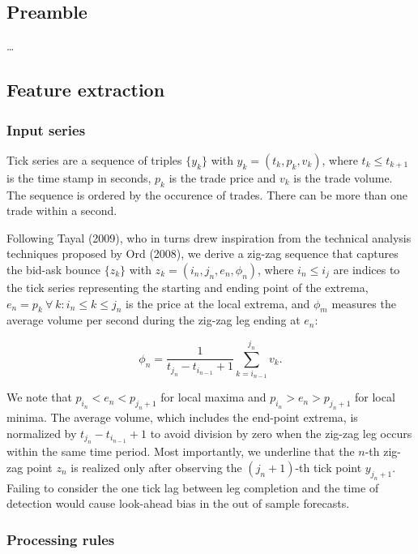 \documentclass[]{article}
\begin{document}
\subsection{Preamble}\label{preamble}

\ldots{}

\subsection{Feature extraction}\label{feature-extraction}

\subsubsection{Input series}\label{input-series}

Tick series are a sequence of triples \(\{y_k\}\) with
\(y_k = (t_k, p_k, v_k)\), where \(t_k \le t_{k+1}\) is the time stamp
in seconds, \(p_k\) is the trade price and \(v_k\) is the trade volume.
The sequence is ordered by the occurence of trades. There can be more
than one trade within a second.

Following Tayal (2009), who in turns drew inspiration from the technical
analysis techniques proposed by Ord (2008), we derive a zig-zag sequence
that captures the bid-ask bounce \(\{z_k\}\) with
\(z_k = (i_n, j_n, e_n, \phi_n)\), where \(i_n \le i_j\) are indices to
the tick series representing the starting and ending point of the
extrema, \(e_n = p_k \ \forall \ k : i_n \le k \le j_n\) is the price at
the local extrema, and \(\phi_m\) measures the average volume per second
during the zig-zag leg ending at \(e_n\):

\[
\phi_n = \frac{1}{t_{j_n} - t_{i_{n-1}} + 1} \sum_{k = i_{n-1}}^{j_n}{v_k}.
\]

We note that \(p_{i_n} < e_n < p_{j_n + 1}\) for local maxima and
\(p_{i_n} > e_n > p_{j_n + 1}\) for local minima. The average volume,
which includes the end-point extrema, is normalized by
\(t_{j_{n}} - t_{i_{n-1}} + 1\) to avoid division by zero when the
zig-zag leg occurs within the same time period. Most importantly, we
underline that the \(n\)-th zig-zag point \(z_n\) is realized only after
observing the \((j_n + 1)\)-th tick point \(y_{j_n + 1}\). Failing to
consider the one tick lag between leg completion and the time of
detection would cause look-ahead bias in the out of sample forecasts.

\subsubsection{Processing rules}\label{processing-rules}
\end{document}
